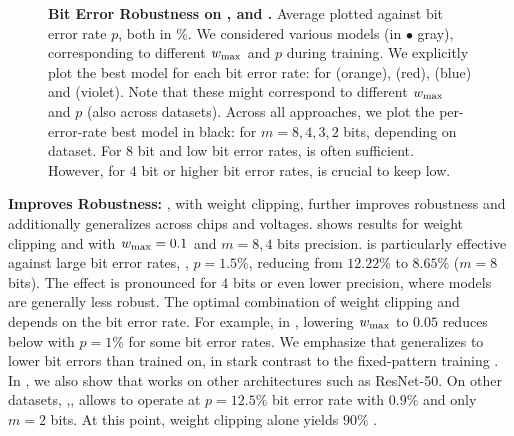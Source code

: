 \begin{figure}[t]
	\hspace*{-0.1cm}
	\vspace*{-14px}
	\caption{\textbf{Bit Error Robustness on \CifarT, \CifarH and \MNIST.} Average \RTE plotted against bit error rate $p$, both in \%. We considered various models (in {\color{gray}$\bullet$ gray}), corresponding to different $\wmax$ and $p$ during training. We explicitly plot the best model for each bit error rate: for \Normal ({\color{colorbrewer5}orange}), \Quant ({\color{colorbrewer1}red}), \Clipping ({\color{colorbrewer2}blue}) and \Random ({\color{colorbrewer4}violet}). Note that these might correspond to different $\wmax$ and $p$ (also across datasets). Across all approaches, we plot the per-error-rate best model in black: for $m = 8,4,3,2$ bits, depending on dataset. For $8$ bit and low bit error rates, \Clipping is often sufficient. However, for $4$ bit or higher bit error rates, \Random is crucial to keep \RTE low.}
	\label{fig:summary}
	\vspace*{-0.2cm}
\end{figure}

\textbf{\Random Improves Robustness:}
%
\Random, with weight clipping, further improves robustness and additionally generalizes across chips and voltages.  shows results for weight clipping and \Random with $\wmax = 0.1$ and $m = 8,4$ bits precision. \Random is particularly effective against large bit error rates, \eg, $p = 1.5\%$, reducing \RTE from $12.22\%$ to $8.65\%$ ($m = 8$ bits). The effect is pronounced for $4$ bits or even lower precision, where models are generally less robust. The optimal combination of weight clipping and \Random depends on the bit error rate. For example, in , lowering $\wmax$ to $0.05$ reduces \RTE below \Random[$0.1$] with $p{=}1\%$ for some bit error rates.
We emphasize that \Random generalizes to lower bit errors than trained on, in stark contrast to the fixed-pattern training \Pattern. In , we also show that \Random works on other architectures such as ResNet-50. On other datasets, \eg,\MNIST, \Random allows to operate at $p = 12.5\%$ bit error rate with $0.9\%$ \RTE and only $m = 2$ bits. At this point, weight clipping alone yields $90\%$ \RTE.

